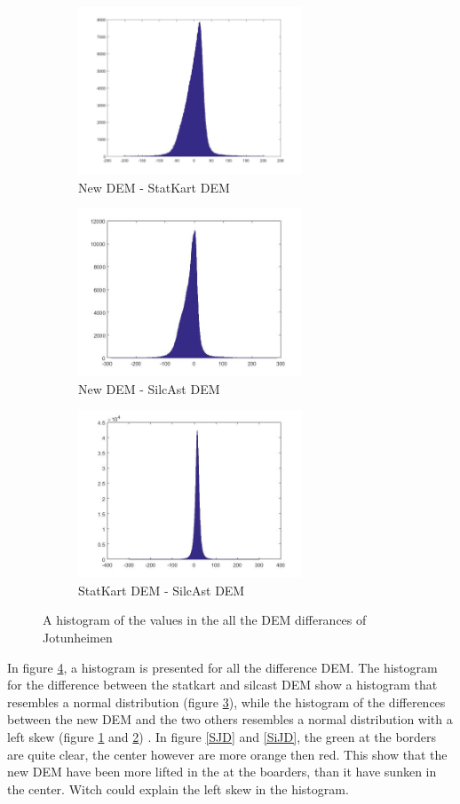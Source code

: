 \documentclass[a4paper,UKenglish]{article}
\begin{document}
\begin{figure}
	\begin{subfigure}{.5\textwidth}
		  \centering
		  \includegraphics[height=5cm]{hist_SJD}
		  \caption{New DEM - StatKart DEM}
		  \label{histSJD}
	\end{subfigure}%
	\begin{subfigure}{.5\textwidth}
		  \centering
		  \includegraphics[height=5cm]{hist_SiJD}
		  \caption{New DEM - SilcAst DEM}
		  \label{histSiJD}
	\end{subfigure}
	\begin{subfigure}{.5\textwidth}
	  \centering
	  \includegraphics[height=5cm]{hist_SSiD}
	  \caption{StatKart DEM - SilcAst DEM}
	  \label{histSSiD}
	\end{subfigure}
		\caption{A histogram of the values in the all the DEM differances of Jotunheimen}
		\label{hist}
\end{figure}

In figure \ref{hist}, a histogram is presented for all the difference DEM. The histogram for the difference between the statkart and silcast DEM show a histogram that resembles a normal distribution (figure \ref{histSSiD}), while the histogram of the differences between the new DEM and the two others resembles a normal distribution with a left skew (figure \ref{histSJD} and \ref{histSiJD}) . In figure \ref{SJD} and \ref{SiJD}, the green at the borders are quite clear, the center however are more orange then red. This show that the new DEM have been more lifted in the at the boarders, than it have sunken in the center. Witch could explain the left skew in the histogram.
\end{document}

